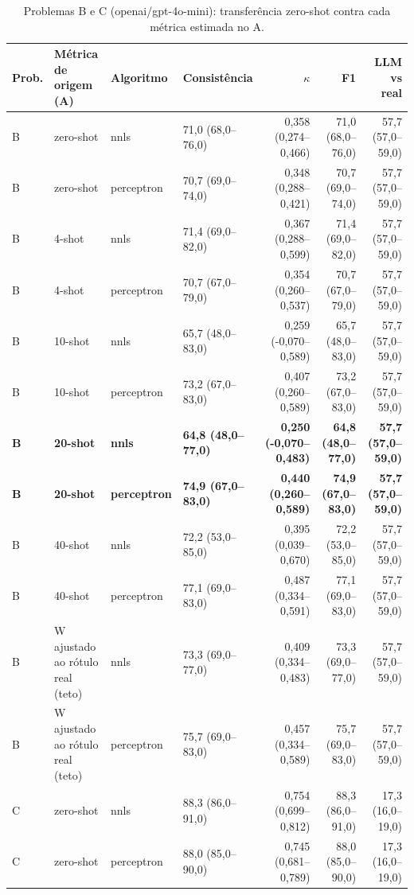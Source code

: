 \begin{table}[htbp]
\centering
\small
\caption{Problemas B e C (openai/gpt-4o-mini): transferência zero-shot contra cada métrica estimada no A.}
\label{tab:T2_BC_gpt4mini}
\begin{tabular}{llllrrr}
\toprule
Prob. & Métrica de origem (A) & Algoritmo & Consistência & $\kappa$ & F1 & LLM vs real \\
\midrule
B & zero-shot & nnls & 71,0 (68,0–76,0) & 0,358 (0,274–0,466) & 71,0 (68,0–76,0) & 57,7 (57,0–59,0) \\
B & zero-shot & perceptron & 70,7 (69,0–74,0) & 0,348 (0,288–0,421) & 70,7 (69,0–74,0) & 57,7 (57,0–59,0) \\
B & 4-shot & nnls & 71,4 (69,0–82,0) & 0,367 (0,288–0,599) & 71,4 (69,0–82,0) & 57,7 (57,0–59,0) \\
B & 4-shot & perceptron & 70,7 (67,0–79,0) & 0,354 (0,260–0,537) & 70,7 (67,0–79,0) & 57,7 (57,0–59,0) \\
B & 10-shot & nnls & 65,7 (48,0–83,0) & 0,259 (-0,070–0,589) & 65,7 (48,0–83,0) & 57,7 (57,0–59,0) \\
B & 10-shot & perceptron & 73,2 (67,0–83,0) & 0,407 (0,260–0,589) & 73,2 (67,0–83,0) & 57,7 (57,0–59,0) \\
\textbf{B} & \textbf{20-shot} & \textbf{nnls} & \textbf{64,8 (48,0–77,0)} & \textbf{0,250 (-0,070–0,483)} & \textbf{64,8 (48,0–77,0)} & \textbf{57,7 (57,0–59,0)} \\
\textbf{B} & \textbf{20-shot} & \textbf{perceptron} & \textbf{74,9 (67,0–83,0)} & \textbf{0,440 (0,260–0,589)} & \textbf{74,9 (67,0–83,0)} & \textbf{57,7 (57,0–59,0)} \\
B & 40-shot & nnls & 72,2 (53,0–85,0) & 0,395 (0,039–0,670) & 72,2 (53,0–85,0) & 57,7 (57,0–59,0) \\
B & 40-shot & perceptron & 77,1 (69,0–83,0) & 0,487 (0,334–0,591) & 77,1 (69,0–83,0) & 57,7 (57,0–59,0) \\
B & W ajustado ao rótulo real (teto) & nnls & 73,3 (69,0–77,0) & 0,409 (0,334–0,483) & 73,3 (69,0–77,0) & 57,7 (57,0–59,0) \\
B & W ajustado ao rótulo real (teto) & perceptron & 75,7 (69,0–83,0) & 0,457 (0,334–0,589) & 75,7 (69,0–83,0) & 57,7 (57,0–59,0) \\
\midrule
C & zero-shot & nnls & 88,3 (86,0–91,0) & 0,754 (0,699–0,812) & 88,3 (86,0–91,0) & 17,3 (16,0–19,0) \\
C & zero-shot & perceptron & 88,0 (85,0–90,0) & 0,745 (0,681–0,789) & 88,0 (85,0–90,0) & 17,3 (16,0–19,0) \\

\end{tabular}
\end{table}
